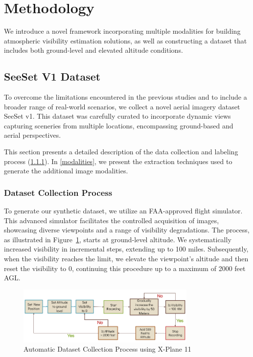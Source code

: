 \section{Methodology}
We introduce a novel framework incorporating multiple modalities for building atmospheric visibility estimation solutions, as well as constructing a dataset that includes both ground-level and elevated altitude conditions. 

\subsection{SeeSet V1 Dataset}
\label{sec:seeset}
To overcome the limitations encountered in the previous studies and to include a broader range of real-world scenarios, we collect a novel aerial imagery dataset SeeSet v1. This dataset was carefully curated to incorporate dynamic views capturing sceneries from multiple locations, encompassing ground-based and aerial perspectives. 

This section presents a detailed description of the data collection and labeling process (\cref{data_collection}). 
In \cref{modalities}, we present the extraction techniques used to generate the additional image modalities. 


\subsubsection{Dataset Collection Process}
\label{data_collection}

To generate our synthetic dataset, we utilize an FAA-approved flight simulator. This advanced simulator facilitates the controlled acquisition of images, showcasing diverse viewpoints and a range of visibility degradations. The process, as illustrated in Figure~\ref{fig:data_collection_process}, starts at ground-level altitude. We systematically increased visibility in incremental steps, extending up to 100 miles. Subsequently, when the visibility reaches the limit, we elevate the viewpoint's altitude and then reset the visibility to 0, continuing this procedure up to a maximum of 2000 feet AGL.


\begin{figure}[htbp]
\centerline{\includegraphics[width=250pt]{imgs/data_collection_pipeline.png}}
\caption{Automatic Dataset Collection Process using X-Plane 11}
\label{fig:data_collection_process}
\end{figure}
 

